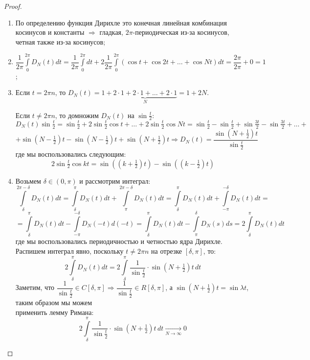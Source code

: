 \documentclass[12pt]{article}
\theoremstyle{definition}
\newcommand{\ddint}[2]{\displaystyle\int\limits_{#1}^{#2}}
\begin{document}
\begin{proof}\hfill
	\begin{enumerate}[label=\arabic*)]
		\item По определению функция Дирихле это конечная линейная комбинация косинусов и константы $\Rightarrow$ гладкая, $2\pi$-периодическая из-за косинусов, четная также из-за косинусов;
		\item $\dfrac{1}{2\pi}\ddint{0}{2\pi}D_N(t)dt = \dfrac{1}{2\pi}\ddint{0}{2\pi}dt + 2\dfrac{1}{2\pi}\ddint{0}{2\pi}\left(\cos{t} + \cos{2t} + \dotsc + \cos{Nt}\right)dt = \dfrac{2\pi}{2\pi} + 0 = 1$;
		\item Если $t = 2\pi n$, то $D_N(t) = 1 + \underbrace{2{\cdot}1 + 2{\cdot}1 + \dotsc + 2{\cdot}1}_{N} = 1 + 2N$. 
		
		Если $t \neq 2\pi n$, то домножим $D_N(t)$ на $\sin{\tfrac{t}{2}}$:
		$$
			D_N(t)\sin{\tfrac{t}{2}} = \sin{\tfrac{t}{2}} + 2 \sin{\tfrac{t}{2}}\cos{t} + \dotsc + 2\sin{\tfrac{t}{2}}\cos{Nt} = \sin{\tfrac{t}{2}} - \sin{\tfrac{t}{2}} + \sin{\tfrac{3t}{2}} - \sin{\tfrac{3t}{2}} + \dotsc +
		$$
		$$
			+ \sin{\left(N - \tfrac{1}{2}\right)t} - \sin{\left(N - \tfrac{1}{2}\right)t} + \sin{\left(N + \tfrac{1}{2}\right)t} \Rightarrow D_N(t) = \dfrac{\sin{\left(N + \tfrac{1}{2}\right)t}}{\sin{\tfrac{t}{2}}}
		$$
		где мы воспользовались следующим:
		$$
			2\sin{\tfrac{t}{2}}\cos{kt} = \sin{\left(\left(k + \tfrac{1}{2}\right)t\right) } - \sin{\left(\left(k -\tfrac{1}{2}\right)t\right)}
		$$
		
		\item Возьмем $\delta \in (0,\pi)$ и рассмотрим интеграл:
		$$
			\ddint{\delta}{2\pi - \delta}D_N(t)dt = \ddint{\delta}{\pi}D_N(t)dt + \ddint{\pi}{2\pi - \delta}D_N(t)dt = \ddint{\delta}{\pi}D_N(t)dt + \ddint{-\pi}{ - \delta}D_N(t)dt =
		$$
		$$
			= \ddint{\delta}{\pi}D_N(t)dt - \ddint{-\pi}{ - \delta}D_N(-t)d(-t) = \ddint{\delta}{\pi}D_N(t)dt - \ddint{\pi}{\delta}D_N(s)ds = 2\ddint{\delta}{\pi}D_N(t)dt
		$$
		где мы воспользовались периодичностью и четностью ядра Дирихле. Распишем интеграл явно, поскольку $t \neq 2\pi n$ на отрезке $[\delta,\pi]$, то:
		$$
			2\ddint{\delta}{\pi}D_N(t)dt = 2 \ddint{\delta}{\pi}\dfrac{1}{\sin{\tfrac{t}{2}}}{\cdot}\sin{\left(N + \tfrac{1}{2}\right)t}\,dt
		$$
		Заметим, что $\dfrac{1}{\sin{\tfrac{t}{2}}} \in C[\delta,\pi] \Rightarrow \dfrac{1}{\sin{\tfrac{t}{2}}} \in R[\delta,\pi]$, а $\sin{\left(N + \tfrac{1}{2}\right)t} = \sin{\lambda t}$, таким образом мы можем\\[4pt] применить лемму Римана:
		$$
			2 \ddint{\delta}{\pi}\dfrac{1}{\sin{\tfrac{t}{2}}}{\cdot}\sin{\left(N + \tfrac{1}{2}\right)t}\,dt \xrightarrow[N\to  \infty]{} 0
		$$
	\end{enumerate}
\end{proof}
\end{document}
